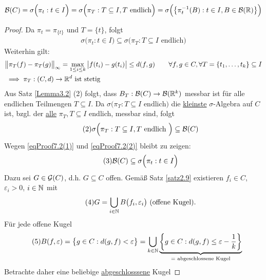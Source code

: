 \begin{satz}\label{satz7.2}
\begin{align*}
\mathcal{B}(C)=\sigma\Big(\pi_t:t\in I\Big)=\sigma\Big(\pi_T:T\subseteq I,T\text{ endlich}\Big)=\sigma\Big(\big\lbrace \pi_t^{-1}(B):t\in I,B\in\mathcal{B}(\mathbb{R})\big\rbrace\Big)
\end{align*}
\end{satz}
\begin{proof}
Da $\pi_t=\pi_{\lbrace t\rbrace}$ und $T=\lbrace t\rbrace$, folgt
\begin{align}\label{eqProof7.2(1)}\tag{1}
\sigma\Big(\pi_t:t\in I\Big)
\subseteq\sigma\Big(\pi_T:T\subseteq I\text{ endlich}\Big)
\end{align}
Weiterhin gilt:
\begin{align*}
&\big\Vert\pi_T(f)-\pi_T(g)\big\Vert_\infty
=\max\limits_{1\leq i\leq k}\big|f(t_i)-g(t_i)\big|
\leq d(f,g)\qquad\forall f,g\in C,\forall T=\lbrace t_1,\ldots,t_k\rbrace\subseteq I\\
&\implies\pi_T:(C,d)\to\mathbb{R}^d\text{ ist stetig}
\end{align*}
Aus Satz \ref{Lemma3.2} (2) folgt, dass $B_T:\mathcal{B}(C)\to\mathcal{B}(\mathbb{R}^k)$ messbar ist für alle endlichen Teilmengen $T\subseteq I$. Da $\sigma\big(\pi_T:T\subseteq I\text{ endlich}\big)$ die \ul{kleinste} $\sigma$-Algebra auf $C$ ist, bzgl. der \ul{alle} $\pi_T,T\subseteq I$ endlich, messbar sind, folgt
\begin{align}\label{eqProof7.2(2)}\tag{2}
\sigma\Big(\pi_T:T\subseteq I,T\text{ endlich }\Big)\subseteq\mathcal{B}(C)
\end{align}
Wegen \eqref{eqProof7.2(1)} und \eqref{eqProof7.2(2)} bleibt zu zeigen:
\begin{align}\label{eqProof7.2(3)}\tag{3}
\mathcal{B}(C)\subseteq\sigma\Big(\pi_t:t\in I\Big)
\end{align}
Dazu sei $G\in\mathcal{G}(C)$, d.h. $G\subseteq C$ offen. Gemäß Satz \ref{satz2.9} existieren $f_i\in C$, $\varepsilon_i>0$, $i\in\mathbb{N}$ mit
\begin{align}\label{eqProof7.2(4)}\tag{4}
G=\bigcup\limits_{i\in\mathbb{N}}B\big(f_i,\varepsilon_i\big)\text{ (offene Kugel)}.
\end{align}
Für jede offene Kugel
\begin{align}\label{eqProof7.2(5)}\tag{5}
B(f,\varepsilon)
&=\big\lbrace g\in C:d(g,f)<\varepsilon\big\rbrace
=\bigcup\limits_{k\in\mathbb{N}}\underbrace{\left\lbrace g\in C:d(g,f)\leq\varepsilon-\frac{1}{k}\right\rbrace}_{=\text{ abgeschlossene Kugel}}
\end{align}
Betrachte daher eine beliebige \ul{abgeschlosssene} Kugel

\end{proof}
